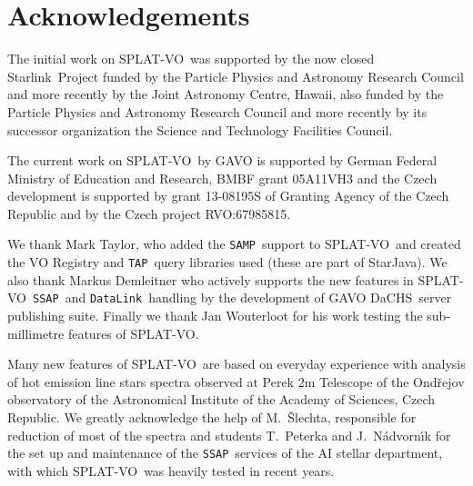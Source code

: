 \documentclass[final,authoryear,5p,times,twocolumn]{elsarticle}
\newcommand{\datalink}{\texttt{DataLink}}
\newcommand{\ssap}{\texttt{SSAP}}
\newcommand{\tap}{\texttt{TAP}}
\newcommand{\samp}{\texttt{SAMP}}
\newcommand{\splatvo}{{\textsf{\small{SPLAT-VO}}}}
\newcommand{\dachs}{\textsf{\small DaCHS}}
\newcommand{\Starlink}{\textsf{\small Starlink}}
\begin{document}
\section*{Acknowledgements}

The initial work on \splatvo\ was supported
by the now closed \Starlink\ Project funded by the Particle Physics and
Astronomy Research Council and more recently by the Joint Astronomy
Centre, Hawaii, also funded by the Particle Physics and Astronomy
Research Council and more recently by its successor organization the
Science and Technology Facilities Council.

The current work on \splatvo\ by GAVO is supported by German Federal
Ministry of Education and Research, BMBF grant 05A11VH3 and the Czech
development is supported by grant 13-08195S of Granting Agency of the
Czech Republic and by the Czech project RVO:67985815.

We thank Mark Taylor, who added the \samp\ support to \splatvo\ and created the
VO Registry and \tap\ query libraries used (these are part of StarJava).  We
also thank Markus Demleitner who actively supports the new features in
\splatvo\ \ssap\ and \datalink\ handling by the development of GAVO \dachs\
server publishing suite.  Finally we thank Jan Wouterloot for his work testing
the sub-millimetre features of \splatvo.

Many new features of \splatvo\ are based on everyday experience with
analysis of hot emission line stars spectra observed at Perek 2m
Telescope of the Ond\v{r}ejov observatory of the Astronomical Institute
of the Academy of Sciences, Czech Republic. We greatly acknowledge the
help of M.~\v{S}lechta, responsible for reduction of most of the
spectra and students T.~Peterka and J.~N\'advorn\'\i{}k for the set up
and maintenance of the \ssap\ services of the AI stellar department,
with which \splatvo\ was heavily tested in recent years.



\end{document}
